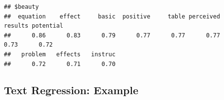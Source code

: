 \documentclass[
  shownotes,
  xcolor={svgnames},
  hyperref={colorlinks,citecolor=DarkBlue,linkcolor=DarkRed,urlcolor=DarkBlue}
  , aspectratio=169]{beamer}
\begin{document}
\begin{frame}[fragile]
\begin{tiny}
\begin{verbatim}
## $beauty
##  equation    effect     basic  positive     table perceived   results potential 
##      0.86      0.83      0.79      0.77      0.77      0.77      0.73      0.72 
##   problem   effects   instruc 
##      0.72      0.71      0.70
\end{verbatim}
\end{tiny}

\end{frame}


\subsection{Text Regression: Example}
\end{document}

